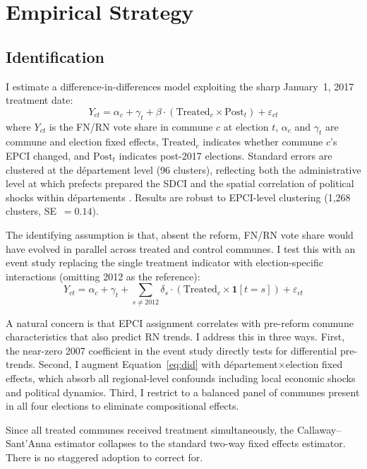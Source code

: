 \documentclass[12pt]{article}
\begin{document}
\section{Empirical Strategy}

\subsection{Identification}

I estimate a difference-in-differences model exploiting the sharp January~1, 2017 treatment date:
\begin{equation}
Y_{ct} = \alpha_c + \gamma_t + \beta \cdot (\text{Treated}_c \times \text{Post}_t) + \varepsilon_{ct}
\label{eq:did}
\end{equation}
where $Y_{ct}$ is the FN/RN vote share in commune $c$ at election $t$, $\alpha_c$ and $\gamma_t$ are commune and election fixed effects, $\text{Treated}_c$ indicates whether commune $c$'s EPCI changed, and $\text{Post}_t$ indicates post-2017 elections. Standard errors are clustered at the d\'{e}partement level (96 clusters), reflecting both the administrative level at which prefects prepared the SDCI and the spatial correlation of political shocks within d\'{e}partements \citep{bertrand2004}. Results are robust to EPCI-level clustering (1,268 clusters, SE~$= 0.14$).

The identifying assumption is that, absent the reform, FN/RN vote share would have evolved in parallel across treated and control communes. I test this with an event study replacing the single treatment indicator with election-specific interactions (omitting 2012 as the reference):
\begin{equation}
Y_{ct} = \alpha_c + \gamma_t + \sum_{s \neq 2012} \delta_s \cdot (\text{Treated}_c \times \mathbf{1}[t = s]) + \varepsilon_{ct}
\end{equation}

A natural concern is that EPCI assignment correlates with pre-reform commune characteristics that also predict RN trends. I address this in three ways. First, the near-zero 2007 coefficient in the event study directly tests for differential pre-trends. Second, I augment Equation~\ref{eq:did} with d\'{e}partement$\times$election fixed effects, which absorb all regional-level confounds including local economic shocks and political dynamics. Third, I restrict to a balanced panel of communes present in all four elections to eliminate compositional effects.

Since all treated communes received treatment simultaneously, the Callaway--Sant'Anna estimator collapses to the standard two-way fixed effects estimator. There is no staggered adoption to correct for.
\end{document}
